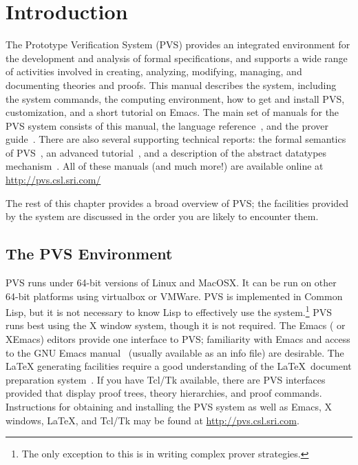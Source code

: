 \chapter{Introduction}
\label{introduction}

The Prototype Verification System (PVS) provides an integrated environment for the development and
analysis of formal specifications, and supports a wide range of activities
involved in creating, analyzing, modifying, managing, and documenting
theories and proofs.  This manual describes the system, including the
system commands, the computing environment, how to get and install PVS,
customization, and a short tutorial on Emacs.  The main set of manuals
for the PVS system consists of this manual, the language
reference~\cite{PVS:language}, and the prover guide~\cite{PVS:prover}.
There are also several supporting technical reports: the formal semantics
of PVS~\cite{PVS:semantics}, an advanced
tutorial~\cite{Rushby&Stringer-Calvert95}, and a description of the
abstract datatypes mechanism~\cite{PVS-ADT:TR}.  All of these manuals (and
much more!) are available online at \url{http://pvs.csl.sri.com/}

The rest of this chapter provides a broad overview of PVS; the facilities
provided by the system are discussed in the order you are likely to
encounter them.

\section*{The PVS Environment}

PVS runs under 64-bit versions of Linux and MacOSX.  It can be run on
other 64-bit platforms using virtualbox or VMWare.  PVS is
implemented in Common Lisp, but it is not necessary to
know Lisp to effectively use the system.\footnote{The only exception to
  this is in writing complex prover strategies.}  PVS runs best using the
X window system, though it is not required.  The Emacs
(\gnuemacs{} or XEmacs) editors provide one
interface to PVS; familiarity with Emacs and access to the GNU Emacs
manual~\cite{emacs20} (usually available as an info file) are desirable.
The \LaTeX{} generating facilities require a good
understanding of the \LaTeX\ document preparation system~\cite{latex2e}.
If you have Tcl/Tk available, there are PVS interfaces provided that
display proof trees, theory hierarchies, and proof commands.  Instructions
for obtaining and installing
the PVS system as well as Emacs, X windows, \LaTeX, and Tcl/Tk may be
found at \url{http://pvs.csl.sri.com}.


